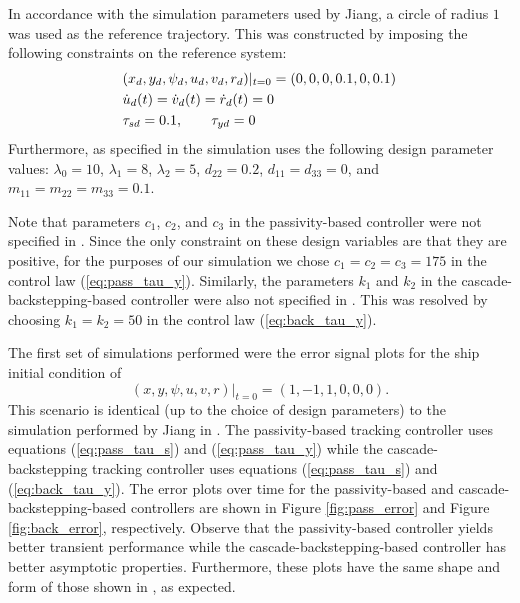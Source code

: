 \documentclass[amsthm, twocolumn]{autart}
\begin{document}
{In accordance with the simulation parameters used by Jiang, a circle of radius $1$ was used as the reference trajectory. This was constructed by imposing the following constraints on the reference system:
\begin{equation}
\begin{aligned}
\centering
&(x_d,y_d,\psi_d,u_d,v_d,r_d)|_{t=0}=(0,0,0,0.1,0,0.1) \\
&\dot{u}_d(t)=\dot{v}_d(t)=\dot{r}_d(t)=0 \\
&\tau_{sd}=0.1, \qquad \tau_{yd}=0
\end{aligned}
\end{equation}
Furthermore, as specified in \cite{Jiang02} the simulation uses the following design parameter values: $\lambda_0=10$, $\lambda_1=8$, $\lambda_2=5$, $d_{22}=0.2$, $d_{11}=d_{33}=0$, and $m_{11}=m_{22}=m_{33}=0.1$. 

Note that parameters $c_1$, $c_2$, and $c_3$ in the passivity-based controller were not specified in \cite{Jiang02}. Since the only constraint on these design variables are that they are positive, for the purposes of our simulation we chose $c_1=c_2=c_3=175$ in the control law (\ref{eq:pass_tau_y}). Similarly, the parameters $k_1$ and $k_2$ in the cascade-backstepping-based controller were also not specified in \cite{Jiang02}. This was resolved by choosing $k_1=k_2=50$ in the control law (\ref{eq:back_tau_y}).

The first set of simulations performed were the error signal plots for the ship initial condition of 
%
\[(x,y,\psi,u,v,r)|_{t=0}=(1,-1,1,0,0,0).\]
%
This scenario is identical (up to the choice of design parameters) to the simulation performed by Jiang in \cite{Jiang02}. The passivity-based tracking controller uses equations (\ref{eq:pass_tau_s}) and (\ref{eq:pass_tau_y}) while the cascade-backstepping tracking controller uses equations (\ref{eq:pass_tau_s}) and (\ref{eq:back_tau_y}). The error plots over time for the passivity-based and cascade-backstepping-based controllers are shown in Figure \ref{fig:pass_error} and Figure \ref{fig:back_error}, respectively. Observe that the passivity-based controller yields better transient performance while the cascade-backstepping-based controller has better asymptotic properties. Furthermore, these plots have the same shape and form of those shown in \cite{Jiang02}, as expected.

}
\end{document}
